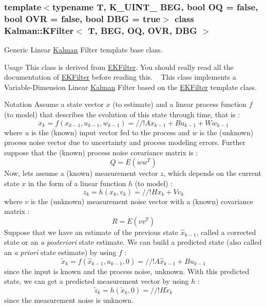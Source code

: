 \subsubsection*{template$<$typename T, K\+\_\+\+U\+I\+N\+T\+\_ B\+EG, bool OQ = false, bool O\+VR = false, bool D\+BG = true$>$\newline
class Kalman\+::\+K\+Filter$<$ T, B\+E\+G, O\+Q, O\+V\+R, D\+B\+G $>$}

Generic Linear \mbox{\hyperlink{namespaceKalman}{Kalman}} Filter template base class. 

\begin{DoxyParagraph}{Usage}
This class is derived from {\ttfamily \mbox{\hyperlink{classKalman_1_1EKFilter}{E\+K\+Filter}}}. You should really read all the documentation of {\ttfamily \mbox{\hyperlink{classKalman_1_1EKFilter}{E\+K\+Filter}}} before reading this. ~\newline
 This class implements a Variable-\/\+Dimension Linear \mbox{\hyperlink{namespaceKalman}{Kalman}} Filter based on the {\ttfamily \mbox{\hyperlink{classKalman_1_1EKFilter}{E\+K\+Filter}}} template class.
\end{DoxyParagraph}
\begin{DoxyParagraph}{Notation}
Assume a state vector $ x $ (to estimate) and a linear process function $ f $ (to model) that describes the evolution of this state through time, that is \+: \[ x_k = f \left( x_{k-1}, u_{k-1}, w_{k-1} \right) = //! A x_{k-1} + B u_{k-1} + W w_{k-1} \] where $ u $ is the (known) input vector fed to the process and $ w $ is the (unknown) process noise vector due to uncertainty and process modeling errors. Further suppose that the (known) process noise covariance matrix is \+: \[ Q = E \left( w w^T \right) \] Now, let\textquotesingle{}s assume a (known) measurement vector $ z $, which depends on the current state $ x $ in the form of a linear function $ h $ (to model) \+: \[ z_k = h \left( x_k, v_k \right) = //! H x_k + V v_k \] where $ v $ is the (unknown) measurement noise vector with a (known) covariance matrix \+: \[ R = E \left( v v^T \right) \] Suppose that we have an estimate of the previous state $ \hat{x}_{k-1} $, called a corrected state or an {\itshape a posteriori} state estimate. We can build a predicted state (also called an {\itshape a priori} state estimate) by using $ f $ \+: \[ \tilde{x}_k = f \left( \hat{x}_{k-1}, u_{k-1}, 0 \right) = //! A \hat{x}_{k-1} + B u_{k-1} \] since the input is known and the process noise, unknown. With this predicted state, we can get a predicted measurement vector by using $ h $ \+: \[ \tilde{z}_k = h \left( \tilde{x}_k, 0 \right) = //! H \tilde{x}_k \] since the measurement noise is unknown.
\end{DoxyParagraph}
